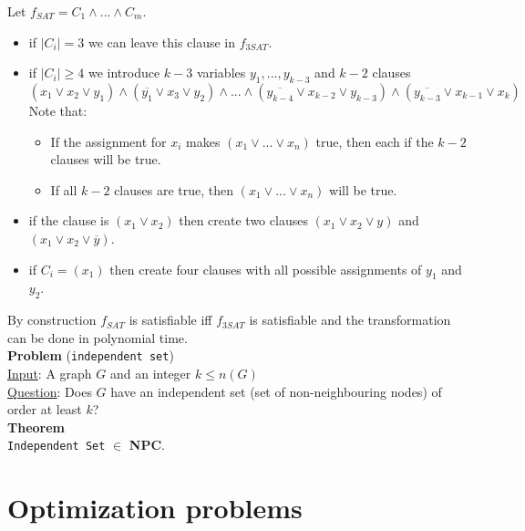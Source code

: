 \documentclass[a4paper, 12pt]{article}
\begin{document}
	Let $f_{SAT} = C_1 \land ... \land C_m$. \begin{itemize}
		\item if $\left|C_i\right| = 3$ we can leave this clause in $f_{3SAT}$.
		\item if $\left|C_i\right| \geq 4$ we introduce $k-3$ variables $y_1,...,y_{k-3}$ and $k-2$ clauses \[(x_1 \lor x_2 \lor y_1) \land (\overline{y_1} \lor x_3 \lor y_2) \land ... \land (\overline{y_{k-4}} \lor x_{k-2} \lor y_{k-3}) \land (\overline{y_{k-3}} \lor x_{k-1} \lor x_k)\]
		Note that: \begin{itemize}
			\item{} If the assignment for $x_i$ makes $(x_1 \lor ... \lor x_n)$ true, then each if the $k-2$ clauses will be true.
			\item If all $k-2$ clauses are true, then $(x_1 \lor ... \lor x_n)$ will be true.
		\end{itemize} 
	\item if the clause is $(x_1\lor x_2)$ then create two clauses $(x_1 \lor x_2 \lor y)$ and $(x_1 \lor x_2 \lor \overline{y})$.
	\item if $C_i = (x_1)$ then create four clauses with all possible assignments of $y_1$ and $y_2$.
	\end{itemize}
	By construction $f_{SAT}$ is satisfiable iff $f_{3SAT}$ is satisfiable and the transformation can be done in polynomial time.\\
	\textbf{Problem} (\texttt{independent set})\\
	\underline{Input}: A graph $G$ and an integer $k \leq n(G)$\\
	\underline{Question}: Does $G$ have an independent set (set of non-neighbouring nodes) of order at least $k$?\\
	\textbf{Theorem}\\
	\texttt{Independent Set} $\in$ \textbf{NPC}.
	\section{Optimization problems}
\end{document}
